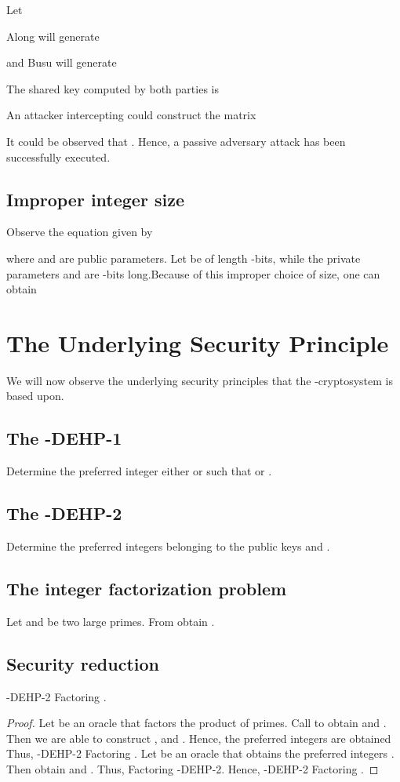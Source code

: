 \documentclass{llncs}
\begin{document}
\begin{example}
Let

Along will generate

and Busu will generate

The shared key computed by both parties is

An attacker intercepting  could construct the
matrix

It could be observed that
. Hence, a passive
adversary attack has been successfully executed.
\end{example}

\subsection{Improper integer size}
Observe the equation given by

where  and  are public parameters. Let  be of
length -bits, while the private parameters  and 
are -bits long.Because of this improper choice of size, one can
obtain


\section{The Underlying Security Principle}
We will now observe the underlying security principles that the
-cryptosystem is based upon.

\subsection{The -DEHP-1}
Determine the preferred integer either   or  such
that  or  .

\subsection{The -DEHP-2}
Determine the preferred integers  belonging
to the public keys  and .

\subsection{The integer factorization problem}
Let  and  be two large primes. From  obtain .

\subsection{Security reduction}
\begin{proposition}
-DEHP-2  Factoring .
\end{proposition}
\begin{proof}
Let  be an oracle that factors the product of primes.
Call  to obtain  and . Then we are able
to construct , 
and . Hence, the preferred integers  are obtained Thus, -DEHP-2 
Factoring . Let  be an oracle that obtains
the preferred integers . Then obtain
 and . Thus, Factoring
 -DEHP-2. Hence, -DEHP-2
 Factoring . 
\end{proof}
\end{document}
